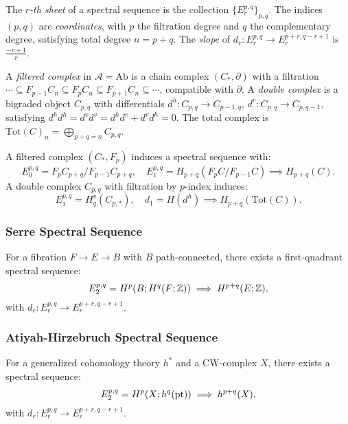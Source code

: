 \documentclass{article}
\begin{document}
\begin{definition}
The \emph{\( r \)-th sheet} of a spectral sequence is the collection \( \{ E_r^{p,q} \}_{p,q} \). The indices \( (p, q) \) are \emph{coordinates}, with \( p \) the filtration degree and \( q \) the complementary degree, satisfying total degree \( n = p + q \). The \emph{slope} of \( d_r: E_r^{p,q} \to E_r^{p+r, q-r+1} \) is \( \frac{-r+1}{r} \).
\end{definition}

\begin{definition}
A \emph{filtered complex} in \( \mathcal{A} = \text{Ab} \) is a chain complex \( (C_*, \partial) \) with a filtration \( \cdots \subseteq F_{p-1} C_n \subseteq F_p C_n \subseteq F_{p+1} C_n \subseteq \cdots \), compatible with \( \partial \). A \emph{double complex} is a bigraded object \( C_{p,q} \) with differentials \( d^h: C_{p,q} \to C_{p-1,q} \), \( d^v: C_{p,q} \to C_{p,q-1} \), satisfying \( d^h d^h = d^v d^v = d^h d^v + d^v d^h = 0 \). The total complex is \( \text{Tot}(C)_n = \bigoplus_{p+q=n} C_{p,q} \).
\end{definition}

\begin{theorem}
A filtered complex \( (C_*, F_p) \) induces a spectral sequence with:
\[
E_0^{p,q} = F_p C_{p+q} / F_{p-1} C_{p+q}, \quad E_1^{p,q} = H_{p+q}(F_p C / F_{p-1} C) \implies H_{p+q}(C).
\]
A double complex \( C_{p,q} \) with filtration by \( p \)-index induces:
\[
E_1^{p,q} = H_q^v(C_{p,*}), \quad d_1 = H(d^h) \implies H_{p+q}(\text{Tot}(C)).
\]
\end{theorem}

\newpage
\subsubsection{Serre Spectral Sequence}

\begin{theorem}
For a fibration \( F \to E \to B \) with \( B \) path-connected, there exists a first-quadrant spectral sequence:
\[
E_2^{p,q} = H^p(B; H^q(F; \mathbb{Z})) \implies H^{p+q}(E; \mathbb{Z}),
\]
with \( d_r: E_r^{p,q} \to E_r^{p+r, q-r+1} \).
\end{theorem}

\subsubsection{Atiyah-Hirzebruch Spectral Sequence}

\begin{theorem}
For a generalized cohomology theory \( h^* \) and a CW-complex \( X \), there exists a spectral sequence:
\[
E_2^{p,q} = H^p(X; h^q(\text{pt})) \implies h^{p+q}(X),
\]
with \( d_r: E_r^{p,q} \to E_r^{p+r, q-r+1} \).
\end{theorem}
\end{document}
